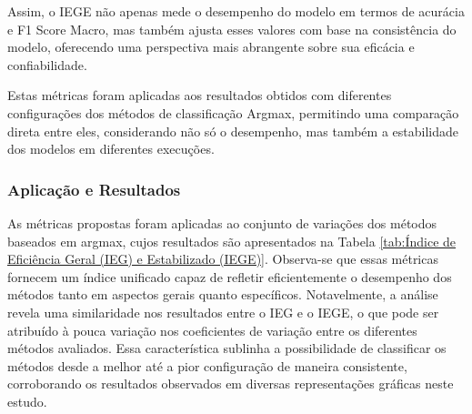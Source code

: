 Assim, o IEGE não apenas mede o desempenho do modelo em termos de acurácia e F1 Score Macro, mas também ajusta esses valores com base na consistência do modelo, oferecendo uma perspectiva mais abrangente sobre sua eficácia e confiabilidade.

Estas métricas foram aplicadas aos resultados obtidos com diferentes configurações dos métodos de classificação Argmax, permitindo uma comparação direta entre eles, considerando não só o desempenho, mas também a estabilidade dos modelos em diferentes execuções.

\subsubsection{Aplicação e Resultados}

As métricas propostas foram aplicadas ao conjunto de variações dos métodos baseados em argmax, cujos resultados são apresentados na Tabela \ref{tab:Índice de Eficiência Geral (IEG) e Estabilizado (IEGE)}. Observa-se que essas métricas fornecem um índice unificado capaz de refletir eficientemente o desempenho dos métodos tanto em aspectos gerais quanto específicos. Notavelmente, a análise revela uma similaridade nos resultados entre o IEG e o IEGE, o que pode ser atribuído à pouca variação nos coeficientes de variação entre os diferentes métodos avaliados. Essa característica sublinha a possibilidade de classificar os métodos desde a melhor até a pior configuração de maneira consistente, corroborando os resultados observados em diversas representações gráficas neste estudo.

